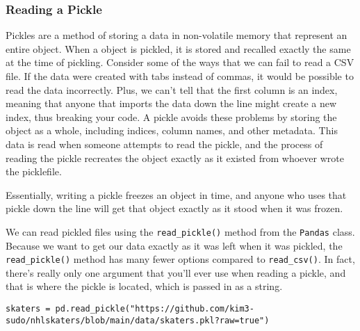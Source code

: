 \subsubsection{Reading a Pickle}
Pickles are a method of storing a data in non-volatile memory that represent an entire  object. When a  object is pickled, it is stored and recalled exactly the same at the time of pickling. Consider some of the ways that we can fail to read a CSV file. If the data were created with tabs instead of commas, it would be possible to read the data incorrectly. Plus, we can't tell  that the first column is an index, meaning that anyone that imports the data down the line might create a new index, thus breaking your code. A pickle avoids these problems by storing the object as a whole, including indices, column names, and other metadata. This data is read when someone attempts to read the pickle, and the process of reading the pickle recreates the object exactly as it existed from whoever wrote the picklefile.\par
Essentially, writing a pickle freezes an object in time, and anyone who uses that pickle down the line will get that object exactly as it stood when it was frozen.\par
We can read pickled files using the \verb|read_pickle()| method from the \verb|Pandas| class. Because we want to get our data exactly as it was left when it was pickled, the \verb|read_pickle()| method has many fewer options compared to \verb|read_csv()|. In fact, there's really only one argument that you'll ever use when reading a pickle, and that is where the pickle is located, which is passed in as a string.\par
\begin{lstlisting}[style=pippython]
skaters = pd.read_pickle("https://github.com/kim3-sudo/nhlskaters/blob/main/data/skaters.pkl?raw=true")
\end{lstlisting}
